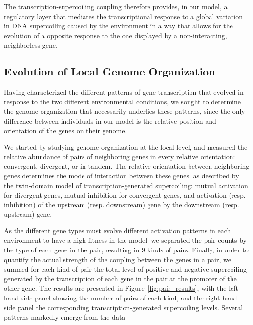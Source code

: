 The transcription-supercoiling coupling therefore provides, in our model, a regulatory layer that mediates the transcriptional response to a global variation in DNA supercoiling caused by the environment in a way that allows for the evolution of a opposite response to the one displayed by a non-interacting, neighborless gene.


\subsection{Evolution of Local Genome Organization}

Having characterized the different patterns of gene transcription that evolved in response to the two different environmental conditions, we sought to determine the genome organization that necessarily underlies these patterns, since the only difference between individuals in our model is the relative position and orientation of the genes on their genome.

We started by studying genome organization at the local level, and measured the relative abundance of pairs of neighboring genes in every relative orientation: convergent, divergent, or in tandem.
The relative orientation between neighboring genes determines the mode of interaction between these genes, as described by the twin-domain model of transcription-generated supercoiling: mutual activation for divergent genes, mutual inhibition for convergent genes, and activation (resp. inhibition) of the upstream (resp. downstream) gene by the downstream (resp. upstream) gene.

As the different gene types must evolve different activation patterns in each environment to have a high fitness in the model, we separated the pair counts by the type of each gene in the pair, resulting in 9 kinds of pairs.
Finally, in order to quantify the actual strength of the coupling between the genes in a pair, we summed for each kind of pair the total level of positive and negative supercoiling generated by the transcription of each gene in the pair at the promoter of the other gene.
The results are presented in Figure~\ref{fig:pair_results}, with the left-hand side panel showing the number of pairs of each kind, and the right-hand side panel the corresponding transcription-generated supercoiling levels.
Several patterns markedly emerge from the data.

